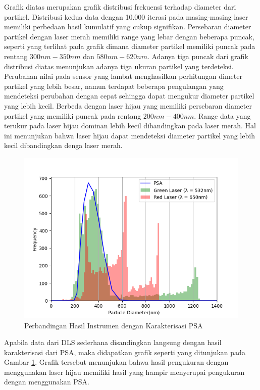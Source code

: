 Grafik diatas merupakan grafik distribusi frekuensi terhadap
diameter dari partikel. Distribusi kedua data dengan 10.000
iterasi pada masing-masing laser memiliki perbedaan hasil
kumulatif yang cukup signifikan. Persebaran diameter partikel
dengan laser merah memiliki range yang lebar dengan beberapa
puncak, seperti yang terlihat pada grafik dimana diameter
partikel memiliki puncak pada rentang ${300nm-350nm}$ dan
${580nm-620nm}$. Adanya tiga puncak dari grafik distribusi diatas
menunjukan adanya tiga ukuran partikel yang terdeteksi. Perubahan
nilai pada sensor yang lambat menghasilkan perhitungan dimeter
partikel yang lebih besar, namun terdapat beberapa pengulangan
yang mendeteksi perubahan dengan cepat sehingga dapat mengukur
diameter partikel yang lebih kecil. Berbeda dengan laser hijau
yang memiliki persebaran diameter partikel yang memiliki puncak
pada rentang ${200nm-400nm}$. Range data yang terukur pada laser
hijau dominan lebih kecil dibandingkan pada laser merah. Hal ini
menunjukan bahwa laser hijau dapat mendeteksi diameter partikel
yang lebih kecil dibandingkan denga laser merah.

\begin{figure}[H]
  \centering
  \includegraphics[width=13cm]{Images/DistribusiWithPSAHist.png}
  \caption{Perbandingan Hasil Instrumen dengan Karakterisasi PSA}
  \label{fig:distwpsa}
\end{figure}

Apabila data dari DLS sederhana disandingkan langsung dengan
hasil karakterisasi dari PSA, maka didapatkan grafik seperti
yang ditunjukan pada Gambar \ref{fig:distwpsa}. Grafik tersebut
menunjukan bahwa hasil pengukuran dengan menggunakan laser
hijau memiliki hasil yang hampir menyerupai pengukuran dengan
menggunakan PSA.



